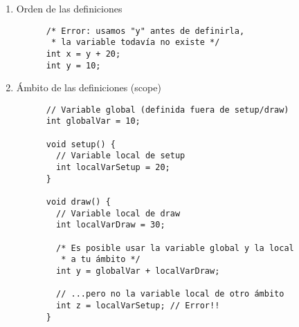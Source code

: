 \documentclass[a4paper,oneside]{article}
\begin{document}
\begin{enumerate}
  \item Orden de las definiciones

    \begin{verbatim}
      /* Error: usamos "y" antes de definirla,
       * la variable todavía no existe */
      int x = y + 20;
      int y = 10;
    \end{verbatim}

  \item Ámbito de las definiciones (scope)

    \begin{verbatim}
      // Variable global (definida fuera de setup/draw)
      int globalVar = 10;

      void setup() {
        // Variable local de setup
        int localVarSetup = 20;
      }

      void draw() {
        // Variable local de draw
        int localVarDraw = 30;

        /* Es posible usar la variable global y la local
         * a tu ámbito */
        int y = globalVar + localVarDraw;

        // ...pero no la variable local de otro ámbito
        int z = localVarSetup; // Error!!
      }
    \end{verbatim}

\end{enumerate}


\newpage
\end{document}
